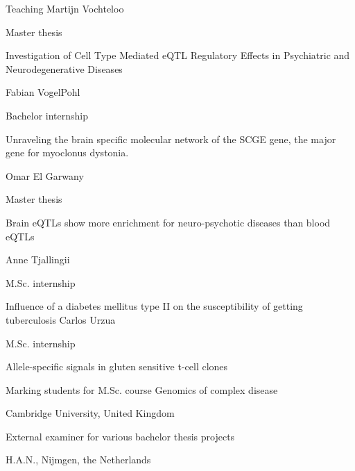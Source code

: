\begin{rubric}{Teaching}
%
Martijn Vochteloo \par
Master thesis \par
Investigation of Cell Type Mediated eQTL Regulatory Effects in Psychiatric and Neurodegenerative Diseases

%
Fabian VogelPohl \par
Bachelor internship \par
Unraveling the brain specific molecular network of the SCGE gene, the major gene for myoclonus dystonia. 

%
Omar El Garwany \par
Master thesis \par
Brain eQTLs show more enrichment for neuro-psychotic diseases than blood eQTLs

%
Anne Tjallingii \par
M.Sc. internship \par
Influence of a diabetes mellitus type II on the susceptibility of getting tuberculosis
%
%
Carlos Urzua \par
M.Sc. internship \par
Allele-specific signals in gluten sensitive t-cell clones


\entry*[Jun 2022]%
Marking students for M.Sc. course Genomics of complex disease \par Cambridge University, United Kingdom

\entry*[Aug 2020, 2021]%
External examiner for various bachelor thesis projects \par
H.A.N., Nijmgen, the Netherlands

\end{rubric}